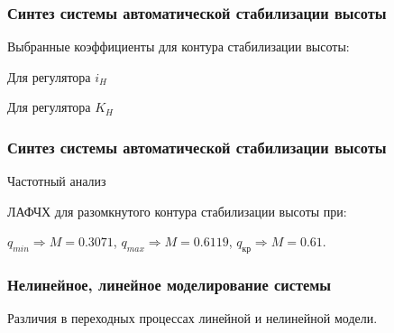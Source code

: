 \documentclass{beamer}
\begin{document}
\begin{frame}[t]
    \frametitle{Синтез системы автоматической стабилизации высоты}
\begin{center}
    Выбранные коэффициенты для контура стабилизации высоты:
    \vspace{14pt}

    \begin{minipage}{0.49\textwidth}
        \begin{center}
            Для регулятора $i_H$\\
            \resizebox{\textwidth}{!}{}
        \end{center}
    \end{minipage}
    \hfill
    \begin{minipage}{0.49\textwidth}
        \begin{center}
            Для регулятора $K_H$\\
            \resizebox{\textwidth}{!}{}
        \end{center}
    \end{minipage}
\end{center}
\end{frame}

\begin{frame}[t]
    \frametitle{Синтез системы автоматической стабилизации высоты}
    \begin{center}
        Частотный анализ
    
        ЛАФЧХ для разомкнутого контура стабилизации высоты при: 

        $q_{min} \Rightarrow M = 0.3071$, $q_{max} \Rightarrow M = 0.6119$,
        $q_{кр} \Rightarrow M=0.61$.
        \resizebox{!}{0.7\textheight}{}
    \end{center}
\end{frame}

\begin{frame}[t]
    \frametitle{Нелинейное, линейное моделирование системы}
\begin{center}
    Различия в переходных процессах линейной и нелинейной модели.
    \vspace{14pt}

        \begin{minipage}{0.45\textwidth}
            \begin{center}
            \resizebox{1.2\textwidth}{!}{}
            \end{center}
        \end{minipage}
        \hfill
        \begin{minipage}{0.45\textwidth}
            \begin{center}
                \resizebox{1.2\textwidth}{!}{}
            \end{center}
        \end{minipage}
\end{center}
\end{frame}
\end{document}
